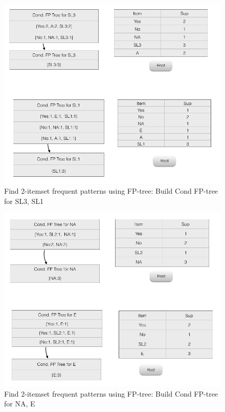 \documentclass[paper=a4, fontsize=11pt]{scrartcl} %
\numberwithin{equation}{section} %
\numberwithin{figure}{section} %
\numberwithin{table}{section} %
\begin{document}
\begin{figure}[h]
    \centering
    \includegraphics[scale=0.5]{image6.png}
    \caption{Find 2-itemset frequent patterns using FP-tree: Build Cond FP-tree for SL3, SL1}
\end{figure}
\begin{figure}[h]
    \centering
    \includegraphics[scale=0.5]{image7.png}
    \caption{Find 2-itemset frequent patterns using FP-tree: Build Cond FP-tree for NA, E}
\end{figure}
\end{document}
